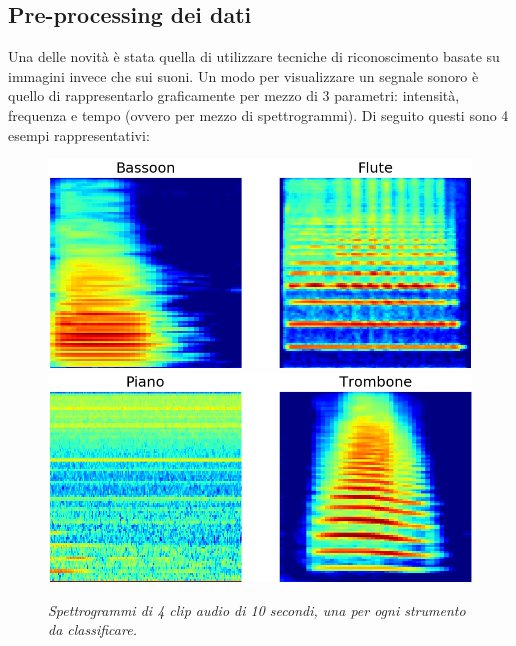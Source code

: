 \documentclass{article}
\begin{document}
\subsection{Pre-processing dei dati}
Una delle novità è stata quella di utilizzare tecniche di riconoscimento basate su immagini invece che sui suoni.
Un modo per visualizzare un segnale sonoro è quello di rappresentarlo graficamente per mezzo di 3 parametri: intensità, frequenza e tempo (ovvero per mezzo
di spettrogrammi).
\clearpage
Di seguito questi sono 4 esempi rappresentativi:
\begin{figure}[h]
    \centering
    \includegraphics[scale=0.5]{immagini/classes_samples_1.png}
    \includegraphics[scale=0.5]{immagini/classes_samples_2.png}
    \caption{\textit{Spettrogrammi di 4 clip audio di 10 secondi, una per ogni strumento da classificare.}}
\end{figure}
\end{document}
